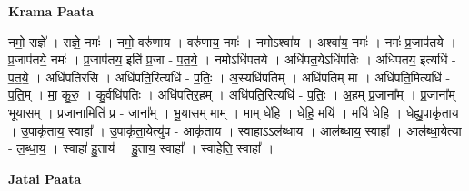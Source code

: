 \documentclass[17pt]{extarticle}
\begin{document}
\textbf{Krama Paata} \newline

नमो॒ राज्ञे᳚ । राज्ञे॒ नमः॑ । नमो॒ वरु॑णाय । वरु॑णाय॒ नमः॑ । नमोऽश्वा॑य । अश्वा॑य॒ नमः॑ । नमः॑ प्र॒जाप॑तये । प्र॒जाप॑तये॒ नमः॑ । प्र॒जाप॑तय॒ इति॑ प्र॒जा - प॒त॒ये॒ । नमोऽधि॑पतये । अधि॑पत॒येऽधि॑पतिः । अधि॑पतय॒ इत्यधि॑ - प॒त॒ये॒ । अधि॑पतिरसि । अधि॑पति॒रित्यधि॑ - प॒तिः॒ । अ॒स्यधि॑पतिम् । अधि॑पतिम् मा । अधि॑पति॒मित्यधि॑ - प॒ति॒म् । मा॒ कु॒रु॒ । कु॒र्वधि॑पतिः । अधि॑पतिर॒हम् । अधि॑पति॒रित्यधि॑ - प॒तिः॒ । अ॒हम् प्र॒जाना᳚म् । प्र॒जाना᳚म् भूयासम् । प्र॒जाना॒मिति॑ प्र - जाना᳚म् । भू॒या॒स॒म् माम् । माम् धे॑हि । धे॒हि॒ मयि॑ । मयि॑ धेहि । धे॒ह्यु॒पाकृ॑ताय । उ॒पाकृ॑ताय॒ स्वाहा᳚ । उ॒पाकृ॑ता॒येत्यु॑प - आकृ॑ताय । स्वाहाऽऽल॑ब्धाय । आल॑ब्धाय॒ स्वाहा᳚ । आल॑ब्धा॒येत्या - ल॒ब्धा॒य॒ । स्वाहा॑ हु॒ताय॑ । हु॒ताय॒ स्वाहा᳚ । स्वाहेति॒ स्वाहा᳚ । \newline

\textbf{Jatai Paata} \newline
\end{document}
